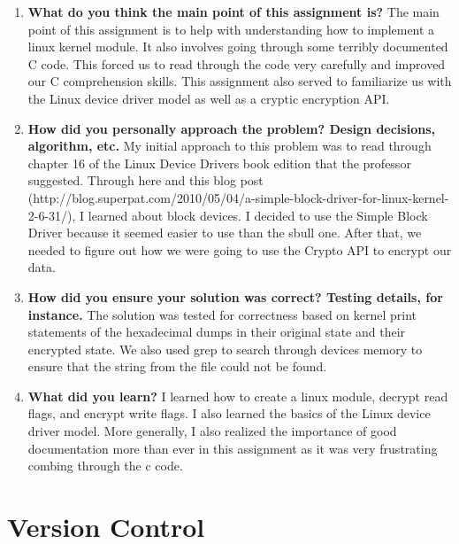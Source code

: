 \documentclass[onecolumn, draftclsnofoot,10pt, compsoc]{IEEEtran}
\begin{document}
\begin{enumerate}
\item \textbf{What do you think the main point of this assignment is?}
The main point of this assignment is to help with understanding how to implement a linux kernel module. It also involves going through some terribly documented C code. This forced us to read through the code very carefully and improved our C comprehension skills. This assignment also served to familiarize us with the Linux device driver model as well as a cryptic encryption API. 

\item \textbf{How did you personally approach the problem? Design decisions, algorithm, etc.}
My initial approach to this problem was to read through chapter 16 of the Linux Device Drivers book edition that the professor suggested. Through here and this blog post (http://blog.superpat.com/2010/05/04/a-simple-block-driver-for-linux-kernel-2-6-31/), I learned about block devices. I decided to use the Simple Block Driver because it seemed easier to use than the sbull one. After that, we needed to figure out how we were going to use the Crypto API to encrypt our data. 

\item \textbf{How did you ensure your solution was correct? Testing details, for instance.}
The solution was tested for correctness based on kernel print statements of the hexadecimal dumps in their original state and their encrypted state. We also used grep to search through devices memory to ensure that the string from the file could not be found. 

\item \textbf{What did you learn?}
I learned how to create a linux module, decrypt read flags, and encrypt write flags. I also learned the basics of the Linux device driver model. More generally, I also realized the importance of good documentation more than ever in this assignment as it was very frustrating combing through the c code. 

\end{enumerate}

\section{Version Control}
\end{document}
